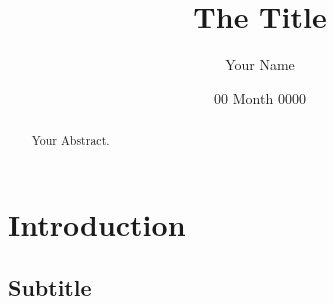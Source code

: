 \documentclass{uofg-basic-article}
\title{The Title} %
\author{Your Name} %
\date{00 Month 0000} %
\begin{document}
\maketitle

\begin{abstract}
    Your Abstract.
\end{abstract}

\tableofcontents


\section{Introduction}
\lipsum[1-3]

\subsection*{Subtitle}
\lipsum[4-5]






\end{document}
